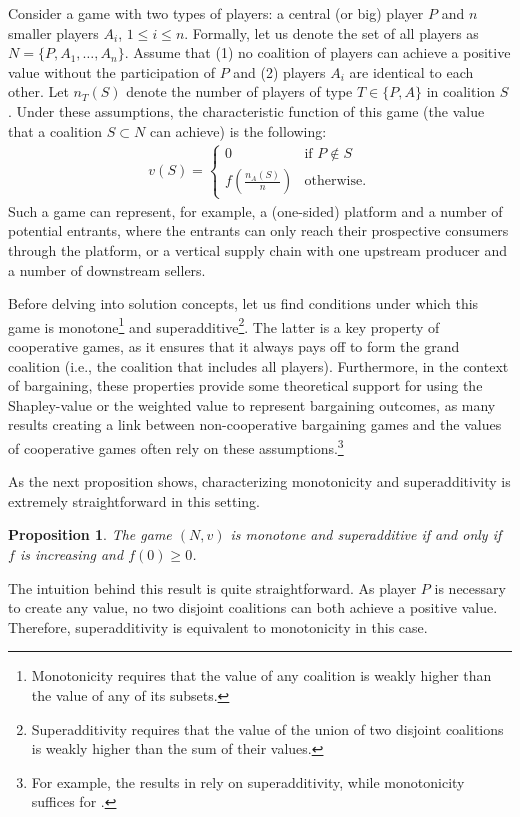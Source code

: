 \documentclass[a4paper]{article}
\newtheorem{proposition}{Proposition}
\begin{document}
Consider a game with two types of players: a central (or big) player $P$ and $n$ smaller players $A_i$, $1 \leq i \leq n$.
Formally, let us denote the set of all players as $N = \{P, A_1, \dots, A_n\}$.
Assume that (1) no coalition of players can achieve a positive value without the participation of $P$ and (2) players $A_i$ are identical to each other.
Let $n_T(S)$ denote the number of players of type $T \in \{P, A\}$ in coalition $S$.
Under these assumptions, the characteristic function of this game (the value that a coalition $S \subset N$ can achieve) is the following:
\begin{align*}
    v(S) = \begin{cases}
        0                              & \text{if } P \notin S \\
        f\left(\frac{n_A(S)}{n}\right) & \text{otherwise}.
    \end{cases}
\end{align*}
Such a game can represent, for example, a (one-sided) platform and a number of potential entrants, where the entrants can only reach their prospective consumers through the platform, or a vertical supply chain with one upstream producer and a number of downstream sellers.

Before delving into solution concepts, let us find conditions under which this game is monotone\footnote{
    Monotonicity requires that the value of any coalition is weakly higher than the value of any of its subsets.
} and superadditive\footnote{
    Superadditivity requires that the value of the union of two disjoint coalitions is weakly higher than the sum of their values.
}.
The latter is a key property of cooperative games, as it ensures that it always pays off to form the grand coalition (i.e., the coalition that includes all players).
Furthermore, in the context of bargaining, these properties provide some theoretical support for using the Shapley-value or the weighted value to represent bargaining outcomes, as many results creating a link between non-cooperative bargaining games and the values of cooperative games often rely on these assumptions.\footnote{
    For example, the results in \textcite{gul1989bargaining} rely on superadditivity, while monotonicity suffices for \textcite[]{hart1996bargaining}.
}

As the next proposition shows, characterizing monotonicity and superadditivity is extremely straightforward in this setting.
\begin{proposition}
    \label{prop:monotone}
    The game $(N, v)$ is monotone and superadditive if and only if $f$ is increasing and $f(0) \geq 0$.
\end{proposition}
The intuition behind this result is quite straightforward.
As player $P$ is necessary to create any value, no two disjoint coalitions can both achieve a positive value.
Therefore, superadditivity is equivalent to monotonicity in this case.
\end{document}
